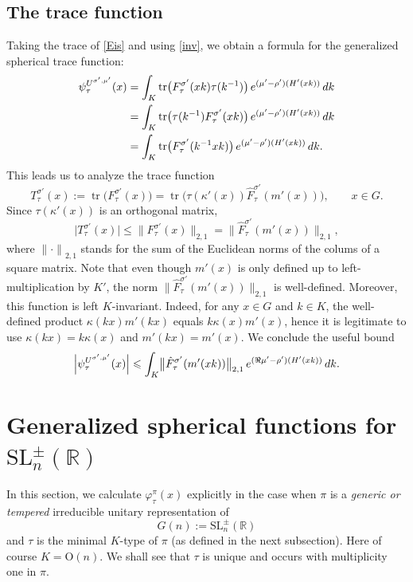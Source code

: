 \documentclass[11pt,oneside]{amsart}
\numberwithin{equation}{section}
\theoremstyle{remark}
\theoremstyle{plain}
\DeclareMathOperator{\tr}{tr}
\newcommand\SL{\mathrm{SL}}
\newcommand\OO{\mathrm{O}}
\newcommand\RR{\mathbb{R}}
\renewcommand\leq{\leqslant}
\begin{document}
\subsection{The trace function}\label{sec27}
Taking the trace of \eqref{Eis} and using \eqref{inv}, we obtain a formula for the generalized spherical trace function:
\begin{align}
\notag \psi_\tau^{U^{\sigma',\mu'}}(x)
&=\int_K \tr\bigl(F_\tau^{\sigma'}(xk)\tau(k^{-1})\bigr)\,e^{(\mu'-\rho')(H'(xk))}\,dk\\
\notag &=\int_K \tr\bigl(\tau(k^{-1})F_\tau^{\sigma'}(xk)\bigr)\,e^{(\mu'-\rho')(H'(xk))}\,dk\\
\label{eq:formula_nonminimal_spherical_trace_function} &=\int_K \tr\bigl(F_\tau^{\sigma'}(k^{-1}xk)\bigr)\,e^{(\mu'-\rho')(H'(xk))}\,dk.
\end{align}
This leads us to analyze the trace function
\begin{equation}\label{eq:T-sigma'}
T_\tau^{\sigma'}(x):=\tr\bigl(F_\tau^{\sigma'}(x)\bigr)=\tr\bigl(\tau(\kappa'(x))\hat F_\tau^{\sigma'}(m'(x))\bigr),\qquad x\in G.
\end{equation}
Since $\tau(\kappa'(x))$ is an orthogonal matrix,
\begin{equation}\label{tracebound}
\bigl|T_\tau^{\sigma'}(x)\bigr|\leq \bigl\| F_\tau^{\sigma'}(x)\bigr\|_{2,1} = \bigl\|\hat F_\tau^{\sigma'}(m'(x))\bigr\|_{2,1},
\end{equation}
where ${\|\cdot\|}_{2,1}$ stands for the sum of the Euclidean norms of the colums of a square matrix. 
Note that even though $m'(x)$ is only defined up to left-multiplication by $K'$, the norm 
$\|\hat F_\tau^{\sigma'}(m'(x))\bigr\|_{2,1}$ is well-defined. Moreover, this function is left $K$-invariant. Indeed, for any $x\in G$ and $k\in K$, the well-defined product $\kappa(kx)m'(kx)$ equals $k\kappa(x)m'(x)$, hence it is legitimate to use $\kappa(kx)=k\kappa(x)$ and $m'(kx)=m'(x)$. We conclude the useful bound
\begin{equation}\label{tracefunctionbound}
\Bigl|\psi_\tau^{U^{\sigma',\mu'}}(x)\Bigr|\leq
\int_K \bigl\|\hat F_\tau^{\sigma'}(m'(xk))\bigr\|_{2,1}\,e^{(\Re\mu'-\rho')(H'(xk))}\,dk.
\end{equation}

\section{Generalized spherical functions for $\SL_n^{\pm}(\RR)$}\label{sec:generalized-spherical-trace-function-SL}
In this section, we calculate $\varphi_\tau^\pi(x)$ explicitly in the case when $\pi$ is a \emph{generic or tempered} irreducible unitary representation of
\[G(n):=\SL_n^{\pm}(\RR)\]
and $\tau$ is the minimal $K$-type of $\pi$ (as defined in the next subsection). Here of course $K=\OO(n)$. We shall see that $\tau$ is unique and occurs with multiplicity one in $\pi$.
\end{document}
